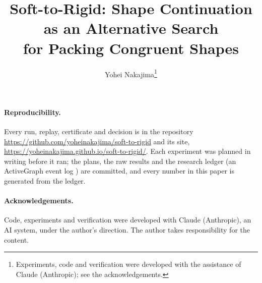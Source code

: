 \documentclass[11pt]{article}
\title{Soft-to-Rigid: Shape Continuation as an Alternative Search\\ for Packing Congruent Shapes}
\author{Yohei Nakajima\thanks{Experiments, code and verification were developed with the assistance of Claude (Anthropic); see the acknowledgements.}}
\date{\builtdate}
\begin{document}
\maketitle

\begin{abstract}

\end{abstract}



\sloppy
\paragraph{Reproducibility.} Every run, replay, certificate and decision is in the repository \url{https://github.com/yoheinakajima/soft-to-rigid} and its site, \url{https://yoheinakajima.github.io/soft-to-rigid/}. Each experiment was planned in writing before it ran; the plans, the raw results and the research ledger (an ActiveGraph event log \cite{activegraph}) are committed, and every number in this paper is generated from the ledger.

\paragraph{Acknowledgements.} Code, experiments and verification were developed with Claude (Anthropic), an AI system, under the author's direction. The author takes responsibility for the content.

\FloatBarrier

\setlength{\bibsep}{1pt plus 0.3ex}
\renewcommand{\bibfont}{\footnotesize}



\end{document}
